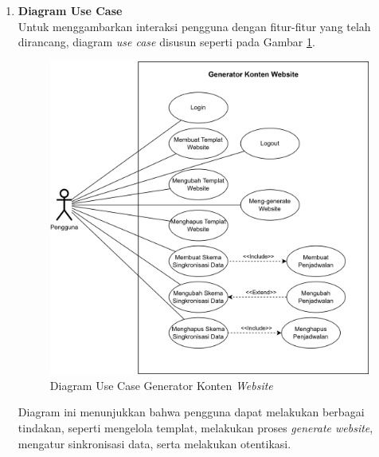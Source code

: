 \begin{enumerate}[label*=\arabic*.,ref=\arabic*]
    
    \item \textbf{Diagram Use Case}\\
    Untuk menggambarkan interaksi pengguna dengan fitur-fitur yang telah dirancang, diagram \textit{use case} disusun seperti pada Gambar \ref{fig:usecase-diagram}.
    \begin{figure}[H]
        \centering
        \includegraphics[width=0.8\linewidth]{figures/UseCaseDiagram.png}
        \caption{Diagram Use Case Generator Konten \textit{Website}}
        \label{fig:usecase-diagram}
    \end{figure}

    Diagram ini menunjukkan bahwa pengguna dapat melakukan berbagai tindakan, seperti mengelola templat, melakukan proses \textit{generate website}, mengatur sinkronisasi data, serta melakukan otentikasi.


\end{enumerate}
